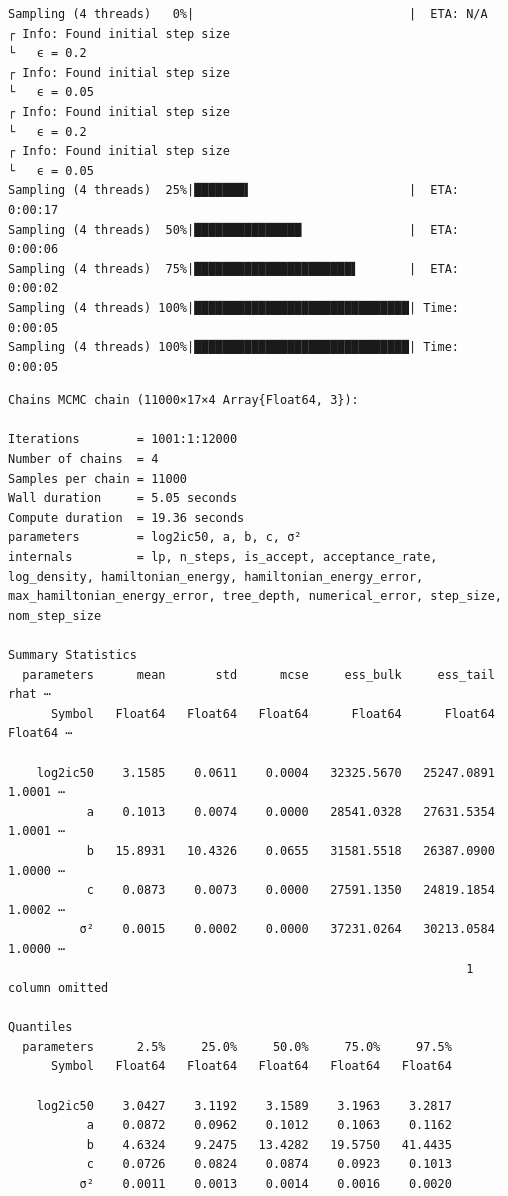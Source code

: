 \documentclass[
]{scrartcl}
\begin{document}
\begin{verbatim}
Sampling (4 threads)   0%|                              |  ETA: N/A
┌ Info: Found initial step size
└   ϵ = 0.2
┌ Info: Found initial step size
└   ϵ = 0.05
┌ Info: Found initial step size
└   ϵ = 0.2
┌ Info: Found initial step size
└   ϵ = 0.05
Sampling (4 threads)  25%|███████▌                      |  ETA: 0:00:17
Sampling (4 threads)  50%|███████████████               |  ETA: 0:00:06
Sampling (4 threads)  75%|██████████████████████▌       |  ETA: 0:00:02
Sampling (4 threads) 100%|██████████████████████████████| Time: 0:00:05
Sampling (4 threads) 100%|██████████████████████████████| Time: 0:00:05
\end{verbatim}

\begin{verbatim}
Chains MCMC chain (11000×17×4 Array{Float64, 3}):

Iterations        = 1001:1:12000
Number of chains  = 4
Samples per chain = 11000
Wall duration     = 5.05 seconds
Compute duration  = 19.36 seconds
parameters        = log2ic50, a, b, c, σ²
internals         = lp, n_steps, is_accept, acceptance_rate, log_density, hamiltonian_energy, hamiltonian_energy_error, max_hamiltonian_energy_error, tree_depth, numerical_error, step_size, nom_step_size

Summary Statistics
  parameters      mean       std      mcse     ess_bulk     ess_tail      rhat ⋯
      Symbol   Float64   Float64   Float64      Float64      Float64   Float64 ⋯

    log2ic50    3.1585    0.0611    0.0004   32325.5670   25247.0891    1.0001 ⋯
           a    0.1013    0.0074    0.0000   28541.0328   27631.5354    1.0001 ⋯
           b   15.8931   10.4326    0.0655   31581.5518   26387.0900    1.0000 ⋯
           c    0.0873    0.0073    0.0000   27591.1350   24819.1854    1.0002 ⋯
          σ²    0.0015    0.0002    0.0000   37231.0264   30213.0584    1.0000 ⋯
                                                                1 column omitted

Quantiles
  parameters      2.5%     25.0%     50.0%     75.0%     97.5%
      Symbol   Float64   Float64   Float64   Float64   Float64

    log2ic50    3.0427    3.1192    3.1589    3.1963    3.2817
           a    0.0872    0.0962    0.1012    0.1063    0.1162
           b    4.6324    9.2475   13.4282   19.5750   41.4435
           c    0.0726    0.0824    0.0874    0.0923    0.1013
          σ²    0.0011    0.0013    0.0014    0.0016    0.0020
\end{verbatim}
\end{document}

